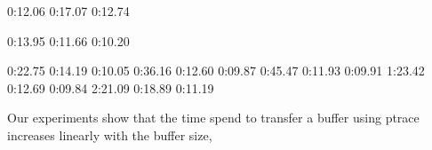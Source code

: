 0:12.06
0:17.07
0:12.74

0:13.95
0:11.66
0:10.20

0:22.75
0:14.19
0:10.05
0:36.16
0:12.60
0:09.87
0:45.47
0:11.93
0:09.91
1:23.42
0:12.69
0:09.84
2:21.09
0:18.89
0:11.19




Our experiments show that the time spend to transfer a buffer using ptrace increases linearly with the buffer size, 

